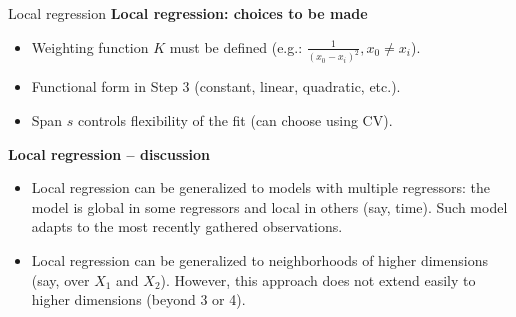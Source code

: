\documentclass{beamer}
\begin{document}
\begin{frame}{Local regression}
\textbf{Local regression: choices to be made}\\
\smallskip
\begin{itemize}
    \item Weighting function $K$ must be defined (e.g.: $\tfrac{1}{(x_0 - x_i)^2}, x_0 \neq x_i$).
    \smallskip
    \item Functional form in Step 3 (constant, linear, quadratic, etc.).
    \smallskip
    \item Span $s$ controls flexibility of the fit (can choose using CV).
\end{itemize}
\bigskip
\textbf{Local regression --  discussion}\\
\smallskip
\begin{itemize}
    \item Local regression can be generalized to models with multiple regressors: the model is global in some regressors and local in others (say, time). Such model adapts to the most recently gathered observations.
    \smallskip
    \item Local regression can be generalized to neighborhoods of higher dimensions (say, over $X_1$ and $X_2$). However, this approach does not extend easily to higher dimensions (beyond 3 or 4).
\end{itemize}
\end{frame}
\end{document}
